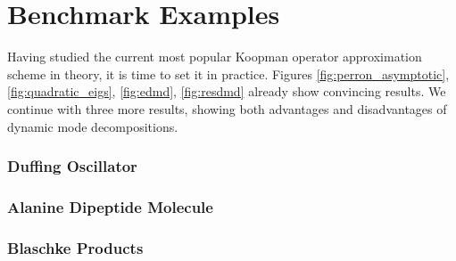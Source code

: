 
\section{Benchmark Examples}\label{sec:benchmark}

Having studied the current most popular Koopman operator approximation scheme in theory, 
it is time to set it in practice. Figures \ref{fig:perron_asymptotic}, 
\ref{fig:quadratic_eigs}, \ref{fig:edmd}, \ref{fig:resdmd} already show convincing 
results. We continue with three more results, showing both advantages and disadvantages 
of dynamic mode decompositions. 

\subsubsection{Duffing Oscillator}

\subsubsection{Alanine Dipeptide Molecule}

\subsubsection{Blaschke Products}

